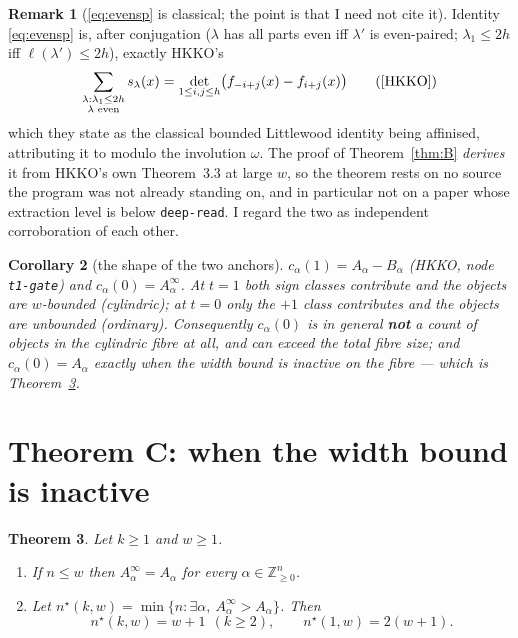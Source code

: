 \documentclass[11pt]{article}
\theoremstyle{plain}
\newtheorem{theorem}{Theorem}
\newtheorem{corollary}[theorem]{Corollary}
\theoremstyle{definition}
\newtheorem{remark}[theorem]{Remark}
\newcommand{\Z}{\mathbb{Z}}
\begin{document}
\begin{remark}[\eqref{eq:evensp} is classical; the point is that I need not cite it]
\label{rem:classical}
Identity \eqref{eq:evensp} is, after conjugation ($\lambda$ has all parts even iff
$\lambda'$ is even-paired; $\lambda_1\le2h$ iff $\ell(\lambda')\le 2h$), exactly HKKO's
\begin{equation}\label{eq:even-sp}
  \sum_{\substack{\lambda:\lambda_1\le 2h\\ \lambda\text{ even}}}s_\lambda(x)
  =\det_{1\le i,j\le h}\bigl(f_{-i+j}(x)-f_{i+j}(x)\bigr)
  \tag{\cite[Eq.~(1.8), source line 1169]{HKKO}}
\end{equation}
which they state as the classical bounded Littlewood identity being affinised, attributing
it to \cite[Eq.~(7.2)]{Stembridge} modulo the involution $\omega$.  The proof of
Theorem~\ref{thm:B} \emph{derives} it from HKKO's own Theorem~3.3 at large $w$, so the
theorem rests on no source the program was not already standing on, and in particular not
on a paper whose extraction level is below \texttt{deep-read}.  I regard the two as
independent corroboration of each other.
\end{remark}

\begin{corollary}[the shape of the two anchors]\label{cor:anchors}
$c_\alpha(1)=A_\alpha-B_\alpha$ (HKKO, node \texttt{t1-gate}) and
$c_\alpha(0)=A^\infty_\alpha$.  At $t=1$ both sign classes contribute and the objects are
$w$-bounded (cylindric); at $t=0$ only the $+1$ class contributes and the objects are
unbounded (ordinary).  Consequently $c_\alpha(0)$ is in general \textbf{not} a count of
objects in the cylindric fibre at all, and can exceed the total fibre size; and
$c_\alpha(0)=A_\alpha$ exactly when the width bound is inactive on the fibre --- which is
Theorem~\ref{thm:C}.
\end{corollary}

\section{Theorem C: when the width bound is inactive}\label{sec:C}

\begin{theorem}\label{thm:C}
Let $k\ge1$ and $w\ge1$.
\begin{enumerate}
\item[(1)] If $n\le w$ then $A^\infty_\alpha=A_\alpha$ for every $\alpha\in\Z_{\ge0}^n$.
\item[(2)] Let $n^\star(k,w)=\min\{n:\exists\alpha,\ A^\infty_\alpha>A_\alpha\}$.  Then
\[
  n^\star(k,w)=w+1\ \ (k\ge2),\qquad n^\star(1,w)=2(w+1).
\]
\end{enumerate}
\end{theorem}
\end{document}
